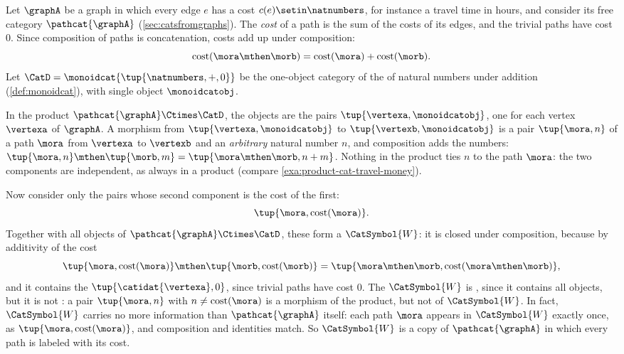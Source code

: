 \begin{example}
    \label{exa:product-cat-weighted-paths}
       Let $\graphA$ be a graph in which every edge $e$ has a cost $c(e) \setin \natnumbers$, for instance a travel time in hours, and consider its free category $\pathcat{\graphA}$ (\cref{sec:catsfromgraphs}).
    The \emph{cost} of a path is the sum of the costs of its edges, and the trivial paths have cost $0$.
    Since composition of paths is concatenation, costs add up under composition:
    \begin{equation}
        \mathrm{cost}(\mora \mthen \morb) = \mathrm{cost}(\mora) + \mathrm{cost}(\morb).
    \end{equation}
    Let $\CatD = \monoidcat{\tup{\natnumbers, +, 0}}$ be the one-object category of the  of natural numbers under addition (\cref{def:monoidcat}), with single object $\monoidcatobj$.

    In the product $\pathcat{\graphA} \Ctimes \CatD$, the objects are the pairs $\tup{\vertexa, \monoidcatobj}$, one for each vertex $\vertexa$ of $\graphA$.
    A morphism from $\tup{\vertexa, \monoidcatobj}$ to $\tup{\vertexb, \monoidcatobj}$ is a pair $\tup{\mora, n}$ of a path $\mora$ from $\vertexa$ to $\vertexb$ and an \emph{arbitrary} natural number $n$, and composition adds the numbers: $\tup{\mora, n} \mthen \tup{\morb, m} = \tup{\mora \mthen \morb, n + m}$.
    Nothing in the product ties $n$ to the path $\mora$: the two components are independent, as always in a product (compare \cref{exa:product-cat-travel-money}).

    Now consider only the pairs whose second component is the cost of the first:
    \begin{equation}
        \tup{\mora, \mathrm{cost}(\mora)}.
    \end{equation}
    Together with all objects of $\pathcat{\graphA} \Ctimes \CatD$, these form a  $\CatSymbol{W}$:
    it is closed under composition, because by additivity of the cost
    \begin{equation}
        \tup{\mora, \mathrm{cost}(\mora)} \mthen \tup{\morb, \mathrm{cost}(\morb)} = \tup{\mora \mthen \morb, \mathrm{cost}(\mora \mthen \morb)},
    \end{equation}
    and it contains the  $\tup{\catidat{\vertexa}, 0}$, since trivial paths have cost $0$.
    The  $\CatSymbol{W}$ is , since it contains all objects, but it is not : a pair $\tup{\mora, n}$ with $n \neq \mathrm{cost}(\mora)$ is a morphism of the product, but not of $\CatSymbol{W}$.
    In fact, $\CatSymbol{W}$ carries no more information than $\pathcat{\graphA}$ itself: each path $\mora$ appears in $\CatSymbol{W}$ exactly once, as $\tup{\mora, \mathrm{cost}(\mora)}$, and composition and identities match.
    So $\CatSymbol{W}$ is a copy of $\pathcat{\graphA}$ in which every path is labeled with its cost.


\end{example}
